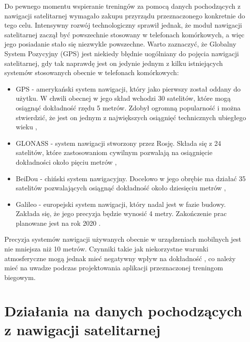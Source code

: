 Do pewnego momentu wspieranie treningów za pomocą danych pochodzących z nawigacji satelitarnej wymagało zakupu przyrządu przeznaczonego konkretnie do tego celu. Intensywny rozwój technologiczny sprawił jednak, że moduł nawigacji satelitarnej zaczął być powszechnie stosowany w telefonach komórkowych, a więc jego posiadanie stało się niezwykle powszechne. Warto zaznaczyć, że Globalny System Pozycyjny (GPS) jest niekiedy błędnie uogólniany do pojęcia nawigacji satelitarnej, gdy tak naprawdę jest on jedynie jednym z kilku istniejących systemów stosowanych obecnie w telefonach komórkowych:
\begin{itemize}
\item{GPS} - amerykański system nawigacji, który jako pierwszy został oddany do użytku. W chwili obecnej w jego skład wchodzi 30 satelitów, które mogą osiągnąć dokładność rzędu 5 metrów. Zdobył ogromną popularność i można stwierdzić, że jest on jednym z największych osiągnięć technicznych ubiegłego wieku \cite{gpsgov},
\item{GLONASS} - system nawigacji stworzony przez Rosję. Składa się z 24 satelitów, które zastosowaniom cywilnym pozwalają na osiągnięcie dokładności około pięciu metrów \cite{gps2},
\item{BeiDou} - chiński system nawigacyjny. Docelowo w jego obrębie ma działać 35 satelitów pozwalających osiągnąć dokładność około dziesięciu metrów \cite{gps2,baidu1},
\item{Galileo} - europejski system nawigacji, który nadal jest w fazie budowy. Zakłada się, że jego precyzja będzie wynosić 4 metry. Zakończenie prac planowane jest na rok 2020 \cite{stronkagps1,gps2}.
\end{itemize}
Precyzja systemów nawigacji używanych obecnie w urządzeniach mobilnych jest nie mniejsza niż 10 metrów. Czynniki takie jak niekorzystne warunki atmosferyczne mogą jednak mieć negatywny wpływ na dokładność \cite{gps2}, co należy mieć na uwadze podczas projektowania aplikacji przeznaczonej treningom biegowym.

\section{Działania na danych pochodzących z nawigacji satelitarnej}
